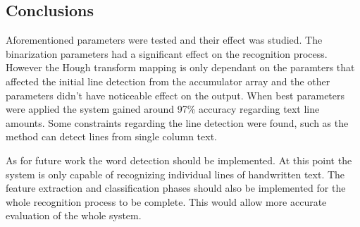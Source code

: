 \documentclass{article}
\begin{document}
\begin{multicols}{2}
        \section*{Conclusions}
          Aforementioned parameters were tested and their effect was studied. The binarization parameters had a significant effect on the recognition process. However the Hough transform mapping is only dependant on the paramters that affected the initial line detection from the accumulator array and the other parameters didn't have noticeable effect on the output. When best parameters were applied the system gained around 97\% accuracy regarding text line amounts. Some constraints regarding the line detection were found, such as the method can detect lines from single column text.

          As for future work the word detection should be implemented. At this point the system is only capable of recognizing individual lines of handwritten text. The feature extraction and classification phases should also be implemented for the whole recognition process to be complete. This would allow more accurate evaluation of the whole system.

          
          {\footnotesize
          }
   \end{multicols}
\end{document}
